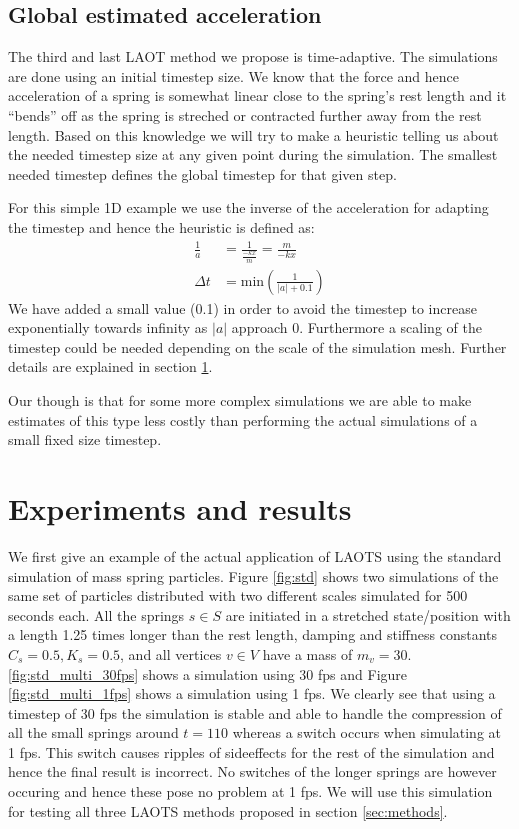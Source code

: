 \documentclass[11pt]{article}
\providecommand{\abs}[1]{\left \lvert #1 \right \rvert}
\begin{document}
\subsection{Global estimated acceleration}
The third and last LAOT method we propose is time-adaptive. The simulations are
done using an initial timestep size. We know that the force and hence
acceleration of a spring is somewhat linear close to the spring's rest length
and it ``bends'' off as the spring is streched or contracted further away from
the rest length. Based on this knowledge we will try to make a heuristic
telling us about the needed timestep size at any given point during the
simulation. The smallest needed timestep defines the global timestep for that
given step.

For this simple 1D example we use the inverse of the acceleration
for adapting the timestep and hence the heuristic is defined as:
\begin{align}
    \frac{1}{a} &= \frac{1}{\frac{-kx}{m}} = \frac{m}{-kx} \\
    \Delta t &= \text{min}\left( \frac{1}{\abs{a} + 0.1} \right )
\end{align}
We have added a small value (0.1) in order to avoid the timestep to increase
exponentially towards infinity as $\abs{a}$ approach 0. Furthermore a scaling
of the timestep could be needed depending on the scale of the simulation mesh.
Further details are explained in section \ref{sec:experiments}.

Our though is that for some more
complex simulations we are able to make estimates of this type less costly than
performing the actual simulations of a small fixed size timestep.


\section{Experiments and results}
\label{sec:experiments}

We first give an example of the actual application of LAOTS using the standard
simulation of mass spring particles. Figure \ref{fig:std} shows two simulations
of the same set of particles distributed with two different scales simulated for
500 seconds each. All the springs $s \in S$ are initiated in a stretched state/position
with a length 1.25 times longer than the rest length, damping and stiffness
constants $C_s = 0.5, K_s = 0.5$, and all vertices $v \in V$
have a mass of $m_v = 30$.
\ref{fig:std_multi_30fps} shows a simulation using 30 fps and Figure
\ref{fig:std_multi_1fps} shows a simulation using 1 fps. We clearly see that
using a timestep of 30 fps the simulation is stable and able to handle the
compression of all the small springs around $t = 110$ whereas a switch occurs
when simulating at 1 fps. This switch causes ripples of sideeffects for the rest
of the simulation and hence the final result is incorrect. No switches of the longer springs are however occuring and hence these pose no problem at 1 fps. We will use this simulation for
testing all three LAOTS methods proposed in section \ref{sec:methods}.
\end{document}
